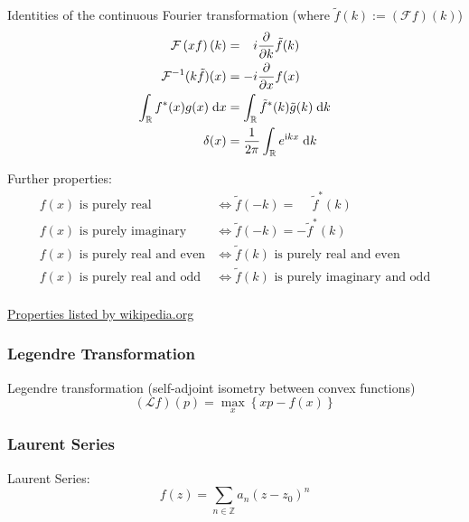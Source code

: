 			\noindent
			Identities of the continuous Fourier transformation (where $\tilde{f}(k) := \left(\mathcal{F}f\right)(k)$)
			\begin{equation}
				\begin{aligned}
					\mathcal{F}\left(xf\right)(k) &= \phantom{-}i \pdv{k}\tilde{f}(k) \\
					\mathcal{F}^{-1}(k\tilde{f})(x) &= -i\pdv{x}f(x) \\
					\int_{\mathbb{R}} f^{*}(x) g(x)\;\dd x &=
					\int_{\mathbb{R}}\tilde{f}^{*}(k)\tilde{g}(k)\;\dd k \\
					\delta(x) &= \frac{1}{2\pi}\int_{\mathbb{R}}e^{\mathrm{i} kx}\;\dd k \\
					\label{Eq:FourierIdentities}
				\end{aligned}
			\end{equation}

			\noindent
			Further properties:
			\begin{equation}
				\begin{aligned}
					f(x)\text{ is purely real} &\Leftrightarrow \tilde{f}(-k) = \phantom{-}\tilde{f}^*(k) \\
					f(x)\text{ is purely imaginary} &\Leftrightarrow \tilde{f}(-k) = -\tilde{f}^*(k) \\
					f(x)\text{ is purely real and even} &\Leftrightarrow \tilde{f}(k)\text{ is purely real and even} \\
					f(x)\text{ is purely real and odd} &\Leftrightarrow \tilde{f}(k)\text{ is purely imaginary and odd} \\
				\end{aligned}
			\end{equation}

			\noindent
			\href{https://en.wikipedia.org/wiki/Fourier_transform#Functional_relationships,_one-dimensional}{Properties listed by wikipedia.org}

		\subsubsection{Legendre Transformation}
			\noindent
			Legendre transformation (self-adjoint isometry between convex functions)
			\begin{equation}
				(\mathcal{L}f)(p)=\max_x\left\lbrace xp-f(x) \right\rbrace
			\end{equation}


		\subsubsection{Laurent Series}
			\noindent
			Laurent Series:
			\begin{equation}
				f(z)=\sum_{n\in\mathbb{Z}} a_n(z-z_0)^n
			\end{equation}

